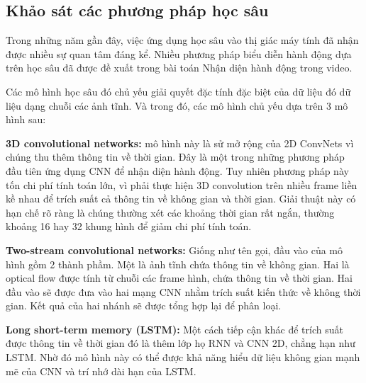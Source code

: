 








\subsection{Khảo sát các phương pháp học sâu}
\label{survey:method-deep-learning}

Trong những năm gần đây, việc ứng dụng học sâu vào thị giác máy tính đã nhận được nhiều sự quan tâm đáng kể. Nhiều phương pháp biểu diễn hành động dựa trên học sâu đã được đề xuất trong bài toán Nhận diện hành động trong video.

Các mô hình học sâu đó chủ yếu giải quyết đặc tính đặc biệt của dữ liệu đó dữ liệu dạng chuỗi các ảnh tĩnh. Và trong đó, các mô hình chủ yếu dựa trên 3 mô hình sau:


\textbf{3D convolutional networks:} mô hình này là sử mở rộng của 2D ConvNets vì chúng thu thêm thông tin về thời gian. Đây là một trong những phương pháp đầu tiên ứng dụng CNN để nhận diện hành động. Tuy nhiên phương pháp này tốn chi phí tính toán lớn, vì phải thực hiện 3D convolution trên nhiều frame liền kề nhau để trích suất cả thông tin về không gian và thời gian. Giải thuật này có hạn chế  rõ ràng là chúng thường xét các khoảng thời gian rất ngắn, thường khoảng 16 hay 32 khung hình để giảm chi phí tính toán.

\textbf{Two-stream convolutional networks:} Giống như tên gọi, đầu vào của mô hình gồm 2 thành phầm. Một là ảnh tĩnh chứa thông tin về không gian. Hai là optical flow được tính từ chuỗi các frame hình, chứa thông tin về thời gian. Hai đầu vào sẽ được đưa vào hai mạng CNN nhằm trích suất kiến thức về không thời gian. Kết quả của hai nhánh sẽ được tổng hợp lại để phân loại.

\textbf{Long short-term memory (LSTM):} Một cách tiếp cận khác để trích suất được thông tin về thời gian đó là thêm lớp họ RNN và CNN 2D, chẳng hạn như LSTM. Nhờ đó mô hình này có thể được khả năng hiểu dữ liệu không gian mạnh mẽ của CNN và trí nhớ dài hạn của LSTM.